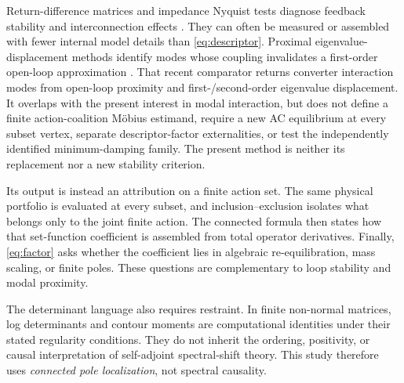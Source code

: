 Return-difference matrices and impedance Nyquist tests diagnose feedback
stability and interconnection effects
\cite{macfarlane1970return,sun2011impedance,rygg2016sequence}. They can often
be measured or assembled with fewer internal model details than
\eqref{eq:descriptor}. Proximal eigenvalue-displacement methods identify modes
whose coupling invalidates a first-order open-loop approximation
\cite{dewangan2026interaction}. That recent comparator returns converter
interaction modes from open-loop proximity and first-/second-order eigenvalue
displacement. It overlaps with the present interest in modal interaction, but
does not define a finite action-coalition M\"obius estimand, require a new AC
equilibrium at every subset vertex, separate descriptor-factor externalities,
or test the independently identified minimum-damping family. The present
method is neither its replacement nor a new stability criterion.

Its output is instead an attribution on a finite action set. The same physical
portfolio is evaluated at every subset, and inclusion--exclusion isolates what
belongs only to the joint finite action. The connected formula then states how
that set-function coefficient is assembled from total operator derivatives.
Finally, \eqref{eq:factor} asks whether the coefficient lies in algebraic
re-equilibration, mass scaling, or finite poles. These questions are
complementary to loop stability and modal proximity.

The determinant language also requires restraint. In finite non-normal
matrices, log determinants and contour moments are computational identities
under their stated regularity conditions. They do not inherit the ordering,
positivity, or causal interpretation of self-adjoint spectral-shift theory.
This study therefore uses \emph{connected pole localization}, not spectral
causality.
